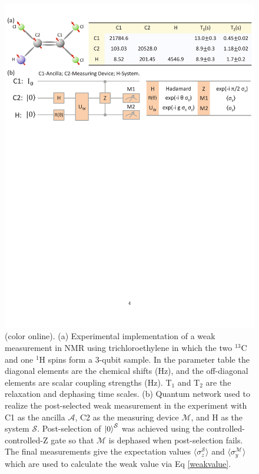 \documentclass[aps,pra,12pt,onecolumn,showpacs,superscriptaddress,floatfix,footinbib,subfigure]{revtex4}
\def\ket#1{\mathinner{|{#1}\rangle}}
\def\es{{\mathcal{S}}}
\def\md{{\mathcal{M}}}
\def\ea{{\mathcal{A}}}
\begin{document}
\begin{figure}[h] \centering
\includegraphics[width=\columnwidth]{molecule.pdf}
\caption{(color online). (a) Experimental implementation of a weak measurement in NMR using trichloroethylene in which the two $^{13}$C and one $^{1}$H spins form a 3-qubit sample. In the parameter table  the diagonal elements are the chemical shifts (Hz), and the off-diagonal elements are scalar coupling strengths (Hz).  T$_1$ and T$_2$ are the relaxation and dephasing time scales.  (b) Quantum network used to realize the post-selected weak measurement in the experiment with  C1 as the ancilla $\ea$, C2 as the measuring device $\md$, and H as the system $\es$.  Post-selection of $\ket{0}^\es$ was  achieved using the controlled-controlled-Z gate so that $\md$ is dephased when post-selection fails.  The final measurements give the expectation values $\langle\sigma_z^\es\rangle$ and $\langle\sigma_y^\md\rangle$ which are used to calculate the weak value via  Eq \eqref{weakvalue}.  }\label{molecule}
\end{figure}
\end{document}
